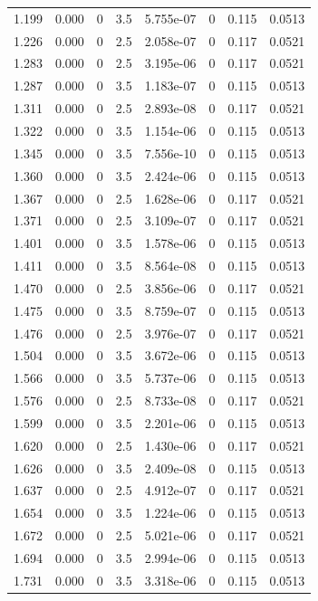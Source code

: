 \documentclass[preview]{standalone}
\begin{document}
{{{\begin{tabular}{L{1.2cm}C{1.2cm} C{0.3cm}C{0.5cm} C{1.4cm}C{1.4cm} C{1.4cm}C{1.4cm}}
  1.199  &  0.000  & 0     & 3.5 &  5.755e-07  & 0  & 0.115 &  0.0513   \\ 
  1.226  &  0.000  & 0     & 2.5 &  2.058e-07  & 0  & 0.117 &  0.0521   \\ 
  1.283  &  0.000  & 0     & 2.5 &  3.195e-06  & 0  & 0.117 &  0.0521   \\ 
  1.287  &  0.000  & 0     & 3.5 &  1.183e-07  & 0  & 0.115 &  0.0513   \\ 
  1.311  &  0.000  & 0     & 2.5 &  2.893e-08  & 0  & 0.117 &  0.0521   \\ 
  1.322  &  0.000  & 0     & 3.5 &  1.154e-06  & 0  & 0.115 &  0.0513   \\ 
  1.345  &  0.000  & 0     & 3.5 &  7.556e-10  & 0  & 0.115 &  0.0513   \\ 
  1.360  &  0.000  & 0     & 3.5 &  2.424e-06  & 0  & 0.115 &  0.0513   \\ 
  1.367  &  0.000  & 0     & 2.5 &  1.628e-06  & 0  & 0.117 &  0.0521   \\ 
  1.371  &  0.000  & 0     & 2.5 &  3.109e-07  & 0  & 0.117 &  0.0521   \\ 
  1.401  &  0.000  & 0     & 3.5 &  1.578e-06  & 0  & 0.115 &  0.0513   \\ 
  1.411  &  0.000  & 0     & 3.5 &  8.564e-08  & 0  & 0.115 &  0.0513   \\ 
  1.470  &  0.000  & 0     & 2.5 &  3.856e-06  & 0  & 0.117 &  0.0521   \\ 
  1.475  &  0.000  & 0     & 3.5 &  8.759e-07  & 0  & 0.115 &  0.0513   \\ 
  1.476  &  0.000  & 0     & 2.5 &  3.976e-07  & 0  & 0.117 &  0.0521   \\ 
  1.504  &  0.000  & 0     & 3.5 &  3.672e-06  & 0  & 0.115 &  0.0513   \\ 
  1.566  &  0.000  & 0     & 3.5 &  5.737e-06  & 0  & 0.115 &  0.0513   \\ 
  1.576  &  0.000  & 0     & 2.5 &  8.733e-08  & 0  & 0.117 &  0.0521   \\ 
  1.599  &  0.000  & 0     & 3.5 &  2.201e-06  & 0  & 0.115 &  0.0513   \\ 
  1.620  &  0.000  & 0     & 2.5 &  1.430e-06  & 0  & 0.117 &  0.0521   \\ 
  1.626  &  0.000  & 0     & 3.5 &  2.409e-08  & 0  & 0.115 &  0.0513   \\ 
  1.637  &  0.000  & 0     & 2.5 &  4.912e-07  & 0  & 0.117 &  0.0521   \\ 
  1.654  &  0.000  & 0     & 3.5 &  1.224e-06  & 0  & 0.115 &  0.0513   \\ 
  1.672  &  0.000  & 0     & 2.5 &  5.021e-06  & 0  & 0.117 &  0.0521   \\ 
  1.694  &  0.000  & 0     & 3.5 &  2.994e-06  & 0  & 0.115 &  0.0513   \\ 
  1.731  &  0.000  & 0     & 3.5 &  3.318e-06  & 0  & 0.115 &  0.0513   \\ 
\hline 
\end{tabular} 

}}}
\end{document}
